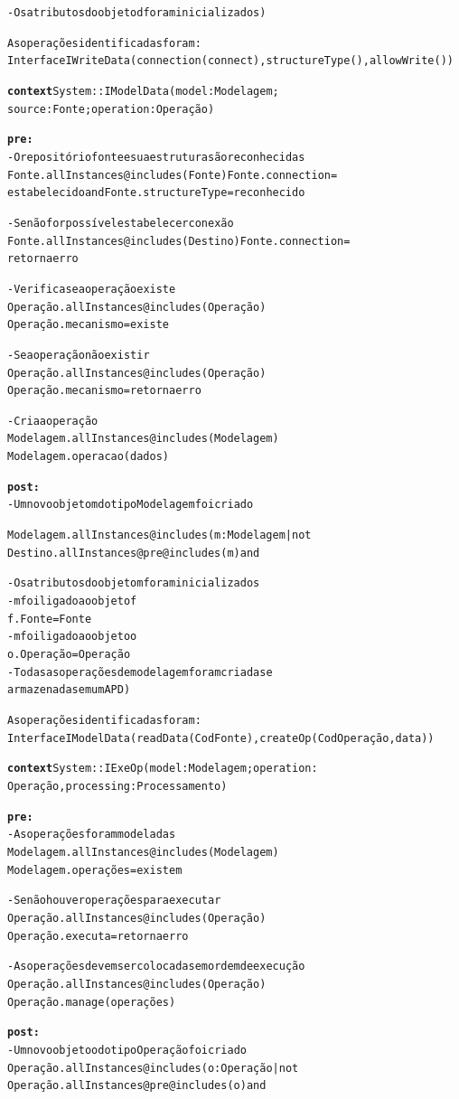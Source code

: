 \begin{alltt}
- Os atributos do objeto d foram inicializados)
\hrulefill

\textnormal{As operações identificadas foram:
Interface IWriteData (connection(connect), structureType(), allowWrite())}

\hrulefill
\textbf{context} System :: IModelData (model : Modelagem; 
source: Fonte; operation: Operação)

\textbf{pre:}
- O repositório fonte e sua estrutura são reconhecidas
Fonte.allInstances@includes(Fonte) Fonte.connection = 
estabelecido and  Fonte.structureType = reconhecido

- Se não for possível estabelecer conexão
Fonte.allInstances@includes(Destino) Fonte.connection = 
retorna  erro

- Verifica se a operação existe
Operação.allInstances@includes(Operação) 
Operação.mecanismo = existe

- Se a operação não existir
Operação.allInstances@includes(Operação) 
Operação.mecanismo = retorna erro

- Cria a operação
Modelagem.allInstances@includes(Modelagem) 
Modelagem.operacao(dados)

\textbf{post:}
- Um novo objeto m do tipo Modelagem foi criado

Modelagem. allInstances@includes (m: Modelagem | not 
Destino.allInstances@pre@includes (m) and

- Os atributos do objeto m foram inicializados
- m foi ligado ao objeto f
f.Fonte = Fonte
- m foi ligado ao objeto o
o.Operação = Operação
- Todas as operações de modelagem foram criadas e 
armazenadas em um APD)
\hrulefill

\textnormal{As operações identificadas foram:
Interface IModelData (readData(CodFonte), createOp(CodOperação, data))}

\hrulefill
\textbf{context} System :: IExeOp (model : Modelagem; operation: 
Operação, processing: Processamento)

\textbf{pre:}
- As operações foram modeladas
Modelagem.allInstances@includes(Modelagem) 
Modelagem.operações = existem 

- Se não houver operações para executar
Operação.allInstances@includes(Operação) 
Operação.executa = retorna  erro

- As operações devem ser colocadas em ordem de execução
Operação.allInstances@includes(Operação) 
Operação.manage(operações)

\textbf{post:}
- Um novo objeto o do tipo Operação foi criado
Operação. allInstances@includes (o: Operação | not 
Operação.allInstances@pre@includes (o) and


\end{alltt}
